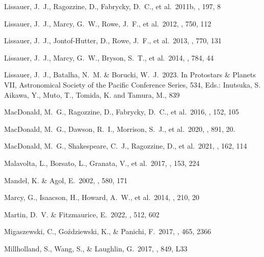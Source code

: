 \documentclass{aastex62}
\begin{document}
\begin{thebibliography}{}
Lissauer, J.~J., Ragozzine, D., Fabrycky, D.~C., et al.~2011b, 
\apjs, 197, 8 

Lissauer, J.~J., Marcy, G.~W., Rowe, J.~F., et al.~2012,
\apj, 750, 112 

Lissauer, J.~J., Jontof-Hutter, D., Rowe, J.~F., et al.~2013,
\apj, 770, 131

Lissauer, J.~J., Marcy, G.~W., Bryson, S.~T., et al.~2014,
\apj, 784, 44

Lissauer, J.~J., Batalha, N.~M. \& Borucki, W.~J.~2023.
 In Protostars \& Planets VII, Astronomical Society of the Pacific Conference Series, 534, 
Eds.: Inutsuka, S. Aikawa, Y., Muto, T., Tomida, K. and Tamura, M., 839



 MacDonald, M.~G., Ragozzine, D., Fabrycky, D.~C., et al.~2016, \aj, 152, 105

 MacDonald, M.~G., Dawson, R.~I., Morrison, S.~J., et al.\ 2020, \apj, 891, 20. %

 MacDonald, M.~G., Shakespeare, C.~J., Ragozzine, D., et al.~2021, \aj, 162, 114

 Malavolta, L., Borsato, L., Granata, V., et al.~2017, \aj, 153, 224

 Mandel, K. \& Agol, E.~2002, \apjl, 580, 171

 Marcy, G., Isaacson, H., Howard, A.~W., et al.~2014, \apjs, 210, 20

 Martin, D.~V. \& Fitzmaurice, E.~2022, \mnras, 512, 602

 Migaszewski, C., Go{\'z}dziewski, K., \&  Panichi, F.~2017, \mnras, 465, 2366

 Millholland, S., Wang, S., \& Laughlin, G.\ 2017, \apjl, 849, L33 %


\end{thebibliography}
\end{document}
